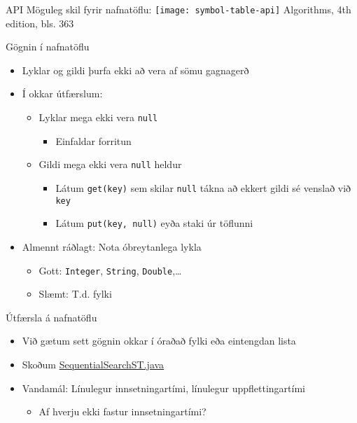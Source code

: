 \documentclass{beamer}
\begin{document}
\begin{frame}{API}
	Möguleg skil fyrir nafnatöflu:
	\vspace{0.5cm}
	\texttt{[image: symbol-table-api]}
	Algorithms, 4th edition, bls. 363
\end{frame}

\begin{frame}{Gögnin í nafnatöflu}
	\begin{itemize}
		\item Lyklar og gildi þurfa ekki að vera af sömu gagnagerð
		\item Í okkar útfærslum:
		      \begin{itemize}
			      \item Lyklar mega ekki vera \texttt{null}
			            \begin{itemize}
				            \item Einfaldar forritun
			            \end{itemize}
			      \item Gildi mega ekki vera \texttt{null} heldur
			            \begin{itemize}
				            \item Látum \texttt{get(key)} sem skilar \texttt{null} tákna að ekkert gildi sé venslað við \texttt{key}
				            \item Látum \texttt{put(key, null)} eyða staki úr töflunni
			            \end{itemize}
		      \end{itemize}
		\item Almennt ráðlagt: Nota óbreytanlega  lykla
		      \begin{itemize}
			      \item Gott: \texttt{Integer}, \texttt{String}, \texttt{Double},\ldots
			      \item Slæmt: T.d. fylki
		      \end{itemize}
	\end{itemize}
\end{frame}

\begin{frame}{Útfærsla á nafnatöflu}
	\begin{itemize}
		\item Við gætum sett gögnin okkar í óraðað fylki eða eintengdan lista
		\item Skoðum \href{http://algs4.cs.princeton.edu/code/edu/princeton/cs/algs4/SequentialSearchST.java.html}{SequentialSearchST.java}
		\item Vandamál: Línulegur innsetningartími, línulegur uppflettingartími
		      \begin{itemize}
			      \item Af hverju ekki fastur innsetningartími?
		      \end{itemize}
	\end{itemize}
\end{frame}
\end{document}
